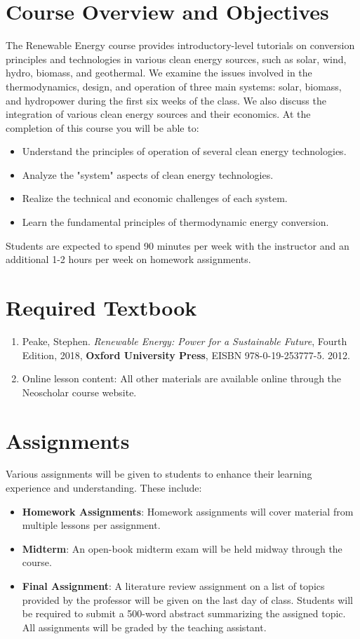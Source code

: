 \documentclass[11pt]{article}
\begin{document}
\section{Course Overview and Objectives}
The Renewable Energy course provides introductory-level tutorials on
conversion principles and technologies in various clean energy sources, such as solar, wind, hydro, biomass, and geothermal. We examine the issues involved in the thermodynamics, design, and operation of three main systems: solar, biomass, and hydropower during the first six weeks of the class. We also discuss the integration of various clean energy sources and their economics. At the completion of this course you will be able to:
\begin{itemize}
    \item Understand the principles of operation of several clean energy technologies.
    \item Analyze the "system" aspects of clean energy technologies.
     \item Realize the technical and economic challenges of each system.
    \item Learn the fundamental principles of thermodynamic energy conversion.
   \end{itemize}


Students are expected to spend 90 minutes per week with the instructor and an additional 1-2 hours per week on homework assignments.
\section{Required Textbook}
\begin{enumerate}
\item Peake, Stephen. \emph{Renewable Energy: Power for a Sustainable Future}, Fourth Edition, 2018, {\bf{Oxford University Press}}, EISBN 978-0-19-253777-5. 
2012.
\item Online lesson content: All other materials are available online through the Neoscholar course website.
\end{enumerate}
\section{Assignments}
Various assignments will be given to students to enhance their learning experience and understanding.  These include:
\begin{itemize}

\item \textbf{Homework Assignments}: Homework assignments
will cover material from multiple lessons per assignment.
\item \textbf{Midterm}: An open-book midterm exam will be held midway through the course.
\item \textbf{Final Assignment}: A literature review assignment on a list of topics provided by the professor will be given on the last day of class.  Students will be required to submit a 500-word abstract summarizing the assigned topic. All assignments will be graded by the teaching assistant.
\end{itemize}
\newpage
\end{document}
